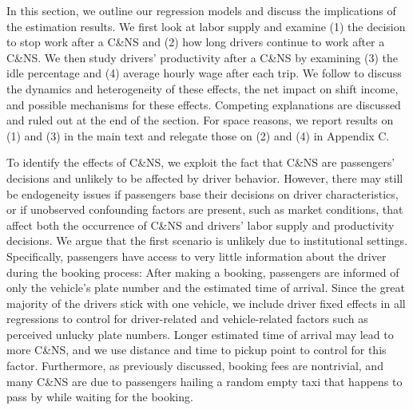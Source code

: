 \documentclass[reviewmode,AEJ]{AEA}
\begin{document}
In this section, we outline our regression models and discuss the implications of the estimation results.
We first look at labor supply and examine (1) the decision to stop work after a C\&NS and (2) how long drivers
continue to work after a C\&NS. We then study drivers' productivity after a C\&NS by examining (3) the idle
percentage and (4) average hourly wage after each trip. We follow to discuss the dynamics and heterogeneity
of these effects, the net impact on shift income, and possible mechanisms for these effects. 
Competing explanations are discussed and ruled out at the end of the section. For space reasons, we report
results on (1) and (3) in the main text and relegate those on (2) and (4) in Appendix C. 

To identify the effects of C\&NS, we exploit the fact that C\&NS are passengers' decisions and unlikely to be
affected by driver behavior. However, there may still be endogeneity issues if passengers base their decisions 
on driver characteristics, or if unobserved confounding factors are present, such as market conditions,
that affect both the occurrence of C\&NS and drivers' labor supply and productivity decisions. 
We argue that the first scenario is unlikely due to institutional settings. Specifically, passengers have 
access to very little information about the driver during the booking process: After making a booking, 
passengers are informed of only the vehicle's plate number and the estimated time of arrival. 
Since the great majority of the drivers stick with one vehicle, we include driver fixed effects in all
regressions to control for driver-related and vehicle-related factors such as perceived unlucky plate numbers.
Longer estimated time of arrival may lead to more C\&NS, and we use distance and time to pickup point to 
control for this factor. 
Furthermore, as previously discussed, booking fees are nontrivial, and many C\&NS are due to passengers
hailing a random empty taxi that happens to pass by while waiting for the booking. 
\end{document}
